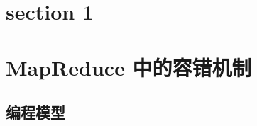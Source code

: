 \documentclass{ctexart}
\begin{document}


\tableofcontents
\newpage

\section{section 1}


\section{MapReduce 中的容错机制}


\subsection{编程模型}





\end{document}
